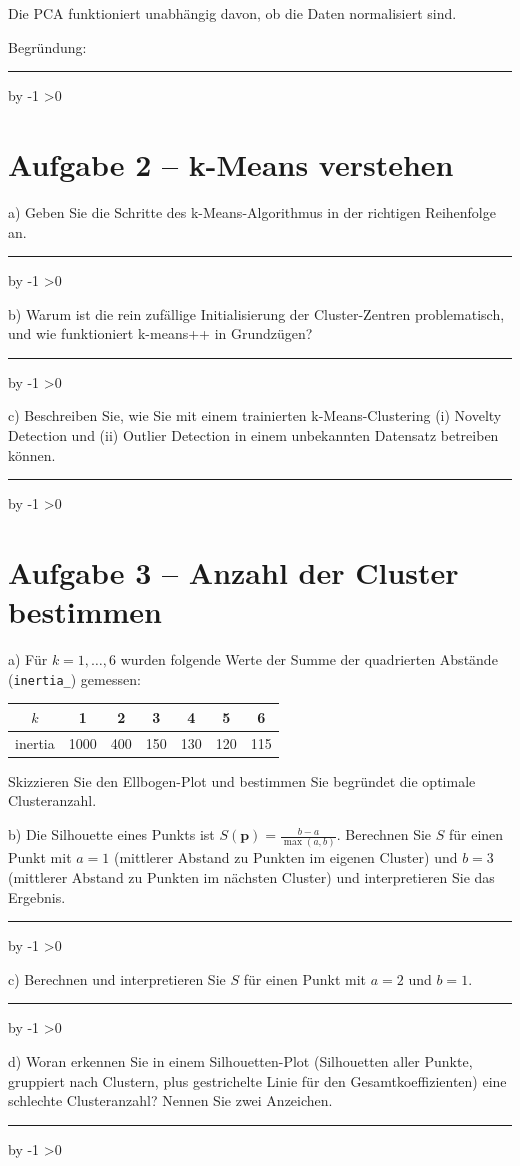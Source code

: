 \documentclass[10pt,a4paper]{article}
\newcommand{\mcbox}{\raisebox{-1pt}{\fbox{\rule{0pt}{7pt}\rule{7pt}{0pt}}}\hspace{6pt}}
\newcommand{\antwortlinien}[1]{%
  \par\vspace{2pt}%
  \newcount\zeilen \zeilen=#1
  \loop
    \noindent\rule{\linewidth}{0.4pt}\par\vspace{11pt}%
    \advance\zeilen by -1
  \ifnum\zeilen>0 \repeat
}
\begin{document}
\mcbox Die PCA funktioniert unabhängig davon, ob die Daten normalisiert sind.

Begründung:
\antwortlinien{2}

\section*{Aufgabe 2 -- k-Means verstehen}

a) Geben Sie die Schritte des k-Means-Algorithmus in der richtigen Reihenfolge an.
\antwortlinien{4}

b) Warum ist die rein zufällige Initialisierung der Cluster-Zentren problematisch,
und wie funktioniert k-means++ in Grundzügen?
\antwortlinien{4}

c) Beschreiben Sie, wie Sie mit einem trainierten k-Means-Clustering (i) Novelty Detection
und (ii) Outlier Detection in einem unbekannten Datensatz betreiben können.
\antwortlinien{4}

\section*{Aufgabe 3 -- Anzahl der Cluster bestimmen}

a) Für $k = 1, \dots, 6$ wurden folgende Werte der Summe der quadrierten Abstände
(\texttt{inertia\_}) gemessen:

\begin{center}
\begin{tabular}{c|cccccc}
$k$ & 1 & 2 & 3 & 4 & 5 & 6\\
\hline
inertia & 1000 & 400 & 150 & 130 & 120 & 115
\end{tabular}
\end{center}

Skizzieren Sie den Ellbogen-Plot und bestimmen Sie begründet die optimale Clusteranzahl.

\vspace{4cm}

b) Die Silhouette eines Punkts ist $S(\boldsymbol{p}) = \frac{b-a}{\max(a,b)}$.
Berechnen Sie $S$ für einen Punkt mit $a = 1$ (mittlerer Abstand zu Punkten im eigenen
Cluster) und $b = 3$ (mittlerer Abstand zu Punkten im nächsten Cluster) und
interpretieren Sie das Ergebnis.
\antwortlinien{2}

c) Berechnen und interpretieren Sie $S$ für einen Punkt mit $a = 2$ und $b = 1$.
\antwortlinien{2}

d) Woran erkennen Sie in einem Silhouetten-Plot (Silhouetten aller Punkte, gruppiert
nach Clustern, plus gestrichelte Linie für den Gesamtkoeffizienten) eine schlechte
Clusteranzahl? Nennen Sie zwei Anzeichen.
\antwortlinien{3}
\end{document}
